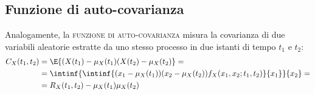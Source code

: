 \subsection{Funzione di auto-covarianza}
Analogamente, la \textsc{funzione di auto-covarianza} misura la covarianza di due variabili aleatorie estratte da uno stesso processo in due istanti di tempo $t_1$ e $t_2$:
\begin{equation}
\label{eq:proc_autocovarianza}
	\begin{split}
		C_X(t_1,t_2)&=\E{(X(t_1)-\mu_X(t_1)(X(t_2)-\mu_X(t_2)}=\\
		&=\intinf{\intinf{(x_1-\mu_X(t_1))(x_2-\mu_X(t_2))f_X(x_1,x_2;t_1,t_2)}{x_1}}{x_2}=\\
		&=R_X(t_1,t_2)-\mu_X(t_1)\mu_X(t_2)
	\end{split}
\end{equation}

